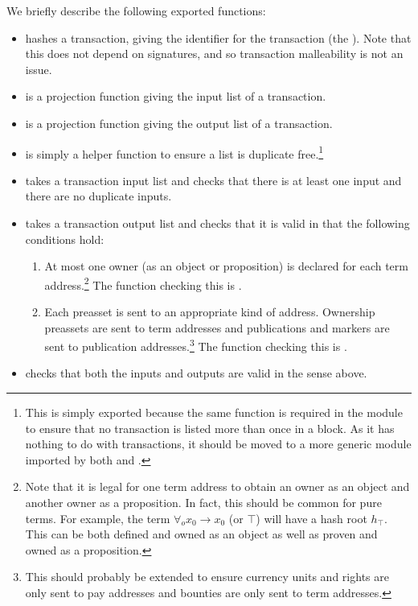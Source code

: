 We briefly describe the following exported functions:
\begin{itemize}
\item {} hashes a transaction, giving the identifier for the transaction (the {}).
Note that this does not depend on signatures, and so transaction malleability is not an issue.
\item {} is a projection function giving the input list of a transaction.
\item {} is a projection function giving the output list of a transaction.
\item {} is simply a helper function to ensure a list is duplicate free.\footnote{This is simply exported because the same function is required in the {} module to ensure that no transaction is listed more than once in a block. As it has nothing to do with transactions, it should be moved to a more generic module imported by both {} and {}.}
\item {} takes a transaction input list
and checks that there is at least one input and there are no duplicate inputs.
\item {} takes a transaction output list
and checks that it is valid in that the following conditions hold:
\begin{enumerate}
\item At most one owner (as an object or proposition) is declared for each term address.\footnote{Note that it is legal for one term address to obtain an owner as an object and another owner as a proposition. In fact, this should be common for pure terms. For example, the term $\forall_o x_0\to x_0$ (or $\top$) will have
a hash root $h_\top$. This can be both defined and owned as an object as well as proven and owned as a proposition.}
The function checking this is {}.
\item Each preasset is sent to an appropriate kind of address.
Ownership preassets are sent to term addresses
and publications and markers are sent to publication addresses.\footnote{This should probably be extended to ensure currency units and rights are only sent to pay addresses and bounties are only sent to term addresses.}
The function checking this is {}.
\end{enumerate}
\item {} checks that both the inputs and outputs are valid in the sense above.

\end{itemize}
